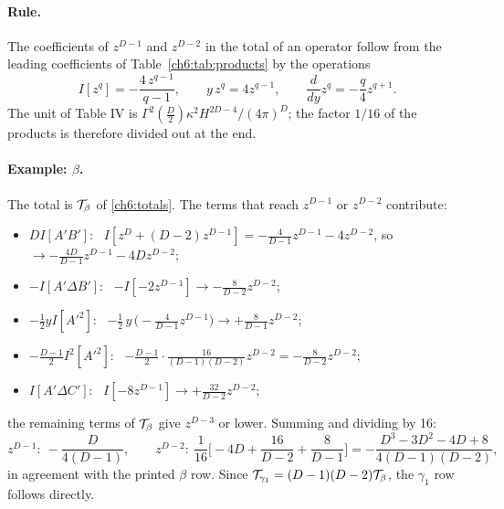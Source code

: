 \paragraph{Rule.} The coefficients of $z^{D-1}$ and $z^{D-2}$ in the total of an operator follow from the leading coefficients of
Table~\ref{ch6:tab:products} by the operations
\begin{equation}
I[z^q]=-\frac{4\,z^{q-1}}{q-1},\qquad y\,z^q=4z^{q-1},\qquad \frac{d}{dy}z^q=-\frac q4z^{q+1}.
\label{ch6:rules}
\end{equation}
The unit of Table IV is $\Gamma^2(\frac D2)\kappa^2H^{2D-4}/(4\pi)^D$; the factor $1/16$ of the products is therefore divided out at the end.

\paragraph{Example: $\beta$.} The total is $\mathcal{T}_\beta$ of \eqref{ch6:totals}. The terms that reach $z^{D-1}$ or $z^{D-2}$ contribute:
\begin{itemize}[leftmargin=14pt]
\item $DI[A'B']$: \ $I[z^D+(D-2)z^{D-1}]=-\frac{4}{D-1}z^{D-1}-4z^{D-2}$, so $\to-\frac{4D}{D-1}z^{D-1}-4Dz^{D-2}$;
\item $-I[A'\Delta B']$: \ $-I[-2z^{D-1}]\to-\frac{8}{D-2}z^{D-2}$;
\item $-\frac12yI[A'^2]$: \ $-\frac12\,y\,\big(-\frac{4}{D-1}z^{D-1}\big)\to+\frac{8}{D-1}z^{D-2}$;
\item $-\frac{D-1}{2}I^2[A'^2]$: \ $-\frac{D-1}{2}\cdot\frac{16}{(D-1)(D-2)}z^{D-2}=-\frac{8}{D-2}z^{D-2}$;
\item $I[A'\Delta C']$: \ $I[-8z^{D-1}]\to+\frac{32}{D-2}z^{D-2}$;
\end{itemize}
the remaining terms of $\mathcal{T}_\beta$ give $z^{D-3}$ or lower. Summing and dividing by 16:
\begin{equation}
z^{D-1}:\ -\frac{D}{4(D-1)},\qquad
z^{D-2}:\ \frac1{16}\Big[-4D+\frac{16}{D-2}+\frac{8}{D-1}\Big]=-\frac{D^3-3D^2-4D+8}{4(D-1)(D-2)},
\end{equation}
in agreement with the printed $\beta$ row. Since $\mathcal{T}_{\gamma_1}=(D-1)(D-2)\mathcal{T}_\beta$, the $\gamma_1$ row follows directly.

